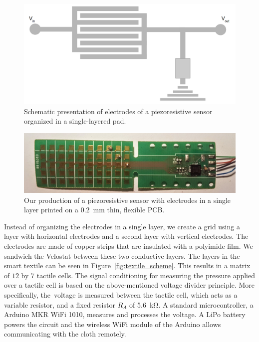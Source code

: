 \documentclass[\home/main.tex]{subfiles}
\begin{document}
\begin{figure}[htpb]
    \centering
    \includegraphics[width=\textwidth]{figures/sensor-pad-principle}
    \caption{Schematic presentation of electrodes of a piezoresistive sensor organized in a single-layered pad.}
    \label{fig:instrumentation_sensor_pad}
\end{figure}

\begin{figure}[htpb]
    \centering
    \includegraphics[width=\textwidth]{figures/flex_pcb}
    \caption{Our production of a piezoresistive sensor with electrodes in a single layer printed on a \qty{0.2}{\milli\meter} thin, flexible PCB.}
    \label{fig:instrumentation_flex_pcb}
\end{figure}

Instead of organizing the electrodes in a single layer, we create a grid using a layer with horizontal electrodes and a second layer with vertical electrodes. The electrodes are made of copper strips that are insulated with a polyimide film. We sandwich the Velostat between these two conductive layers. The layers in the smart textile can be seen in Figure~\ref{fig:textile_scheme}. This results in a matrix of $12$ by $7$ tactile cells. The signal conditioning for measuring the pressure applied over a tactile cell is based on the above-mentioned voltage divider principle. More specifically, the~voltage is measured between the tactile cell, which acts as a variable resistor, and a fixed resistor $R_A$ of \qty{5.6}{\kilo\ohm}. A standard microcontroller, a Arduino MKR WiFi 1010, measures and processes the voltage. A LiPo battery powers the circuit and the wireless WiFi module of the Arduino allows communicating with the cloth remotely.
\end{document}
